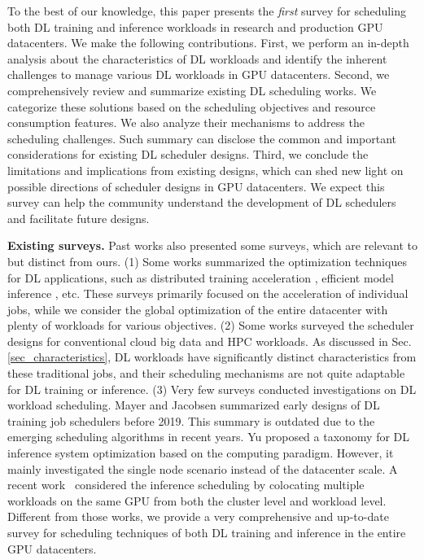 To the best of our knowledge, this paper presents the \textit{first} survey for scheduling both DL training and inference workloads in research and production GPU datacenters. We make the following contributions. First, we perform an in-depth analysis about the characteristics of DL workloads and identify the inherent challenges to manage various DL workloads in GPU datacenters. Second, we comprehensively review and summarize existing DL scheduling works. We categorize these solutions based on the scheduling objectives and resource consumption features. We also analyze their mechanisms to address the scheduling challenges. Such summary can disclose the common and important considerations for existing DL scheduler designs. Third, we conclude the limitations and implications from existing designs, which can shed new light on possible directions of scheduler designs in GPU datacenters. We expect this survey can help the community understand the development of DL schedulers and facilitate future designs.

\noindent\textbf{Existing surveys.} Past works also presented some surveys, which are relevant to but distinct from ours. (1) Some works summarized the optimization techniques for DL applications, such as distributed training acceleration \cite{SurveyDistDL, SurveyDML}, efficient model inference \cite{SurveyPruneQuant, SurveyInfer21}, etc. These surveys primarily focused on the acceleration of individual jobs, while we consider the global optimization of the entire datacenter with plenty of workloads for various objectives. (2) Some works surveyed the scheduler designs for conventional cloud big data \cite{SurveyCloudSched, SurveyCloudSched17} and HPC \cite{SurvHPC, SurveyHPCBigData} workloads. As discussed in Sec. \ref{sec_characteristics}, DL workloads have significantly distinct characteristics from these traditional jobs, and their scheduling mechanisms are not quite adaptable for DL training or inference. (3) Very few surveys conducted investigations on DL workload scheduling. Mayer and Jacobsen \cite{SurvScalableDL} summarized early designs of DL training job schedulers before 2019. This summary is outdated due to the emerging scheduling algorithms in recent years. Yu \etal \cite{SurveyDLServing} proposed a taxonomy for DL inference system optimization based on the computing paradigm. However, it mainly investigated the single node scenario instead of the datacenter scale.
A recent work~\cite{yu2022survey} considered the inference scheduling by colocating multiple workloads on the same GPU from both the cluster level and workload level. 
Different from those works, we provide a very comprehensive and up-to-date survey for scheduling techniques of both DL training and inference in the entire GPU datacenters.








